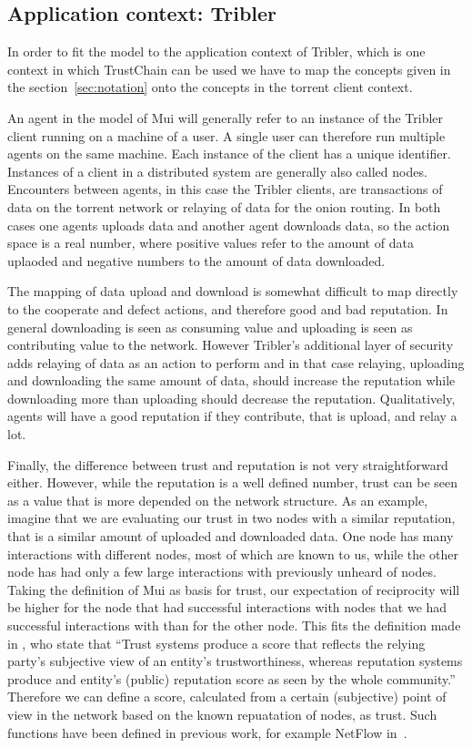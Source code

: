 \subsection{Application context: Tribler}
In order to fit the model to the application context of Tribler, which is one context in which 
TrustChain can be used we have to map the concepts given in the section~\ref{sec:notation} onto the
concepts in the torrent client context.

An agent in the model of Mui will generally refer to an instance of the Tribler client running on a
machine of a user. A single user can therefore run multiple agents on the same machine. Each
instance of the client has a unique identifier. Instances of a client in a distributed system are 
generally also called nodes. Encounters between agents, in this case the Tribler
clients, are transactions of data on the torrent network or relaying of data for the onion routing. 
In both cases one agents uploads data and another agent downloads data, so the action space is a 
real number, where positive values refer to the amount of data uplaoded and negative numbers to the 
amount of data downloaded. 

The mapping of data upload and download is somewhat difficult to map directly to the cooperate and 
defect actions, and therefore good and bad reputation. In general downloading is seen as consuming 
value and uploading is seen as contributing value to the network. However Tribler's additional layer 
of security adds relaying of data as an action to perform and in that case relaying, uploading and 
downloading the same amount of data, should increase the reputation while downloading more than 
uploading should decrease the reputation. Qualitatively, agents will have a good reputation if they
contribute, that is upload, and relay a lot.

Finally, the difference between trust and reputation is not very straightforward either. However, 
while the reputation is a well defined number, trust can be seen as a value that is more depended
on the network structure. As an example, imagine that we are evaluating our trust in two nodes with 
a similar reputation, that is a similar amount of uploaded and downloaded data. One node has many 
interactions with different nodes, most of which are known to us, while the other node has had 
only a few large interactions with previously unheard of nodes. Taking the definition of Mui as 
basis for trust, our expectation of reciprocity will be higher for the node that had successful 
interactions with nodes that we had successful interactions with than for the other node. This fits
the definition made in \cite{josang2007survey}, who state that ``Trust systems produce a score that
reflects the relying party's subjective view of an entity's trustworthiness, whereas reputation 
systems produce and entity's (public) reputation score as seen by the whole community.'' Therefore
we can define a score, calculated from a certain (subjective) point of view in the network based on 
the known repuatation of nodes, as trust. Such functions have been defined in previous work, for 
example NetFlow in~\cite{trustchain}.


